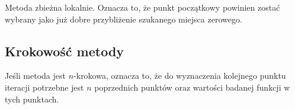 \documentclass[../mn-notatki.tex]{subfiles}
\begin{document}
Metoda zbieżna lokalnie. Oznacza to, że
punkt początkowy powinien zostać wybrany jako już dobre przybliżenie
szukanego miejsca zerowego.

\subsection{Krokowość metody}
\begin{tcolorbox}
Jeśli metoda jest  $n$-krokowa,
oznacza to, że do wyznaczenia kolejnego punktu iteracji potrzebne jest $n$
poprzednich punktów oraz wartości badanej funkcji w tych punktach.
\end{tcolorbox}

\pagebreak
\end{document}

